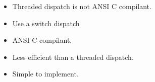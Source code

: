 \begin{slide}
    \begin{itemize}
        \item Threaded dispatch is not ANSI C compilant.
    \end{itemize}
    \begin{itemize}
        \item Use a switch dispatch
    \end{itemize}
    \begin{itemize}
        \item ANSI C compilant.
        \item Less efficient than a threaded dispatch.
        \item Simple to implement.
    \end{itemize}
\end{slide}
